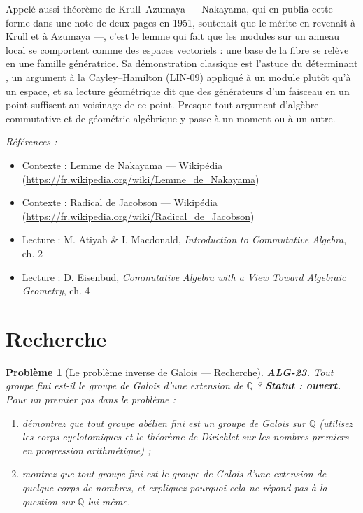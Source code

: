 \documentclass[11pt]{article}
\newtheorem{problem}{Problème}
\newenvironment{refs}{\par\small\noindent\emph{Références :}\begin{itemize}\setlength\itemsep{0pt}}{\end{itemize}\normalsize}
\begin{document}
\noindent Appelé aussi théorème de Krull--Azumaya --- Nakayama, qui en publia cette forme dans une
note de deux pages en 1951, soutenait que le mérite en revenait à Krull et à Azumaya ---, c'est le lemme qui
fait que les modules sur un anneau local se comportent comme des espaces vectoriels : une base de la fibre se
relève en une famille génératrice. Sa démonstration classique est \og{} l'astuce du déterminant \fg{}, un argument à
la Cayley--Hamilton (LIN-09) appliqué à un module plutôt qu'à un espace, et sa lecture géométrique dit que des
générateurs d'un faisceau en un point suffisent au voisinage de ce point. Presque tout argument d'algèbre
commutative et de géométrie algébrique y passe à un moment ou à un autre.

\begin{refs}
\item Contexte : Lemme de Nakayama --- Wikipédia (\url{https://fr.wikipedia.org/wiki/Lemme_de_Nakayama})
\item Contexte : Radical de Jacobson --- Wikipédia (\url{https://fr.wikipedia.org/wiki/Radical_de_Jacobson})
\item Lecture : M. Atiyah \& I. Macdonald, \textit{Introduction to Commutative Algebra}, ch. 2
\item Lecture : D. Eisenbud, \textit{Commutative Algebra with a View Toward Algebraic Geometry}, ch. 4
\end{refs}

\bigskip


\section*{Recherche}

\begin{problem}[{Le problème inverse de Galois --- Recherche}]
\textbf{ALG-23.} Tout groupe fini est-il le groupe de Galois d'une extension de
$\mathbb{Q}$ ? \textbf{Statut : ouvert.} Pour un premier pas dans le problème :
\begin{enumerate}
\item[(i)] démontrez que tout
groupe abélien fini est un groupe de Galois sur $\mathbb{Q}$ (utilisez les corps cyclotomiques et
le théorème de Dirichlet sur les nombres premiers en progression arithmétique) ;
\item[(ii)] montrez que tout groupe fini est
le groupe de Galois d'une extension de \textit{quelque} corps de nombres, et expliquez pourquoi cela ne
répond pas à la question sur $\mathbb{Q}$ lui-même.
\end{enumerate}

\end{problem}
\end{document}
